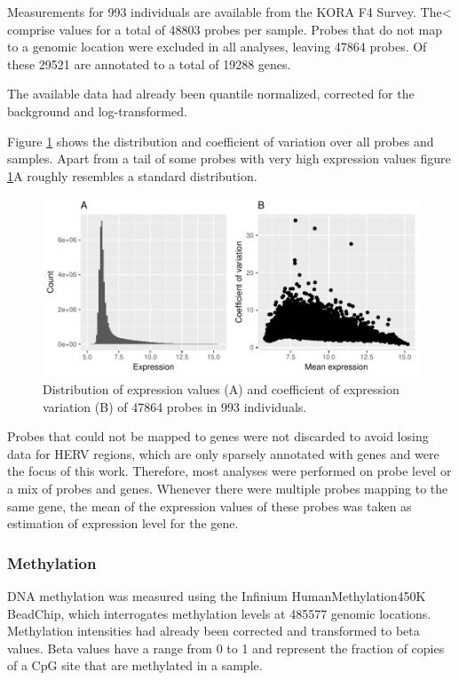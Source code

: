 \documentclass[a4paper,12pt,twoside,openright]{article}
\begin{document}
Measurements for 993 individuals are available from the KORA F4 Survey. The< comprise values for a total of 48803 probes per sample. Probes that do not map to a genomic location were excluded in all analyses, leaving 47864 probes. Of these 29521 are annotated to a total of 19288 genes. 

The available data had already been quantile normalized, corrected for the background and log-transformed. 

Figure \ref{fig:expr.raw.hist.cov} shows the distribution and coefficient of variation over all probes and samples. Apart from a tail of some probes with very high expression values figure \ref{fig:expr.raw.hist.cov}A roughly resembles a standard distribution. 

\begin{figure}[tb]
	\includegraphics[scale = 1, keepaspectratio = true]{../figures/expr_raw_hist_cov}  
	\caption{Distribution of expression values (A) and coefficient of expression variation (B) of 47864 probes in 993 individuals.}
    \label{fig:expr.raw.hist.cov}
\end{figure}


Probes that could not be mapped to genes were not discarded to avoid losing data for HERV regions, which are only sparsely annotated with genes and were the focus of this work. Therefore, most analyses were performed on probe level or a mix of probes and genes. Whenever there were multiple probes mapping to the same gene, the mean of the expression values of these probes was taken as estimation of expression level for the gene. 


\subsubsection{Methylation}
\label{Data:Methylation}
DNA methylation was measured using the Infinium HumanMethylation450K BeadChip, which interrogates methylation levels at 485577 genomic locations. Methylation intensities had already been corrected and transformed to beta values. Beta values have a range from 0 to 1 and represent the fraction of copies of a CpG site that are methylated in a sample.
\end{document}

